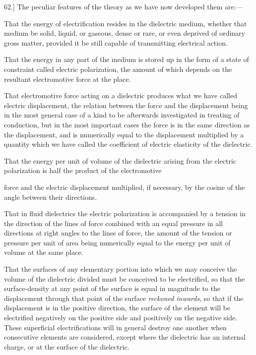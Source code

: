 \documentclass[11pt,a4paper]{article}
\begin{document}
62.] The peculiar features of the theory as we have now developed
them are:---

That the energy of electrification resides in the dielectric medium,
whether that medium be solid, liquid, or gaseous, dense or rare, or
even deprived of ordinary gross matter, provided it be still capable of
transmitting electrical action.

That the energy in any part of the medium is stored up in the form
of a state of constraint called electric polarization, the amount of
which depends on the resultant electromotive force at the place.

That electromotive force acting on a dielectric produces what we have
called electric displacement, the relation between the force and the
displacement being in the most general case of a kind to be afterwards
investigated in treating of conduction, but in the most important cases
the force is in the same direction as the displacement, and is numerically
equal to the displacement multiplied by a quantity which we have called
the coefficient of electric elasticity of the dielectric.

That the energy per unit of volume of the dielectric arising from the
electric polarization is half the product of the electromotive

\clearpage
\setcounter{footnote}{0}

force and the electric displacement multiplied, if necessary, by the
cosine of the angle between their directions.

That in fluid dielectrics the electric polarization is accompanied by
a tension in the direction of the lines of force combined with an equal
pressure in all directions at right angles to the lines of force, the
amount of the tension or pressure per unit of area being numerically
equal to the energy per unit of volume at the same place.

That the surfaces of any elementary portion into which we may conceive
the volume of the dielectric divided must be conceived to be electrified,
so that the surface-density at any point of the surface is equal in
magnitude to the displacement through that point of the surface
\textit{reckoned inwards}, so that if the displacement is in the positive
direction, the surface of the element will be electrified negatively on
the positive side and positively on the negative side. These superficial
electrifications will in general destroy one another when consecutive
elements are considered, except where the dielectric has an internal
charge, or at the surface of the dielectric.
\end{document}

